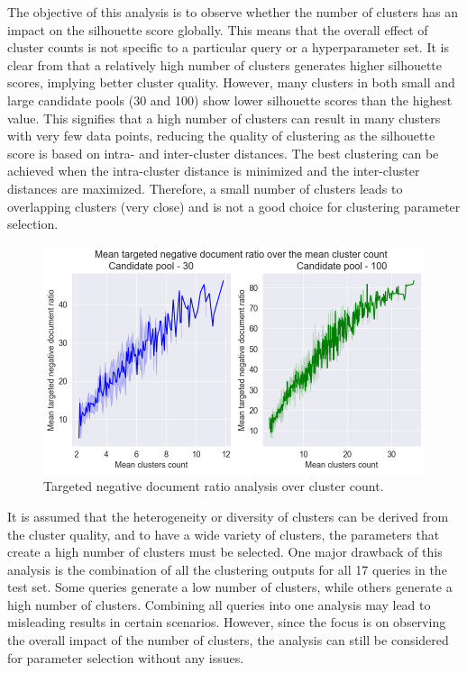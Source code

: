 The objective of this analysis is to observe whether the number of clusters has an impact on the silhouette score globally. This means that the overall effect of cluster counts is not specific to a particular query or a hyperparameter set. It is clear from  that a relatively high number of clusters generates higher silhouette scores, implying better cluster quality. However, many clusters in both small and large candidate pools (30 and 100) show lower silhouette scores than the highest value. This signifies that a high number of clusters can result in many clusters with very few data points, reducing the quality of clustering as the silhouette score is based on intra- and inter-cluster distances. The best clustering can be achieved when the intra-cluster distance is minimized and the inter-cluster distances are maximized. Therefore, a small number of clusters leads to overlapping clusters (very close) and is not a good choice for clustering parameter selection.

\begin{figure}[h]
	\centering
	\includegraphics[width=.99\textwidth]{images/subplots/targetfn_score_ccnt_subplot.png}
	\caption[Targeted negative document ratio analysis.]{Targeted negative document ratio analysis over cluster count.  \label{fig:target_function_vs_cc}}
\end{figure}


It is assumed that the heterogeneity or diversity of clusters can be derived from the cluster quality, and to have a wide variety of clusters, the parameters that create a high number of clusters must be selected. One major drawback of this analysis is the combination of all the clustering outputs for all 17 queries in the test set. Some queries generate a low number of clusters, while others generate a high number of clusters. Combining all queries into one analysis may lead to misleading results in certain scenarios. However, since the focus is on observing the overall impact of the number of clusters, the analysis can still be considered for parameter selection without any issues.


